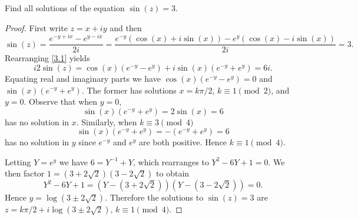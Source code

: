 \documentclass[12pt]{amsart}
\begin{document}
\begin{thm}
  Find all solutions of the equation $\sin(z) = 3$.
  \begin{proof}
    First write $z = x + iy$ and then
    \begin{equation}\label{3.1}
      \sin(z) = \frac{e^{-y + ix} - e^{y - ix}}{2i} = \frac{e^{-y}(\cos(x) + i\sin(x)) - e^y(\cos(x) - i\sin(x))}{2i} = 3.
    \end{equation}
    Rearranging \eqref{3.1} yields
    $$i2\sin(z) = \cos(x)(e^{-y} - e^{y}) + i\sin(x)(e^{-y} + e^y) = 6i.$$
    Equating real and imaginary parts we have $\cos(x)(e^{-y} - e^{y}) = 0$ and $\sin(x)(e^{-y} + e^y)$.
    The former has solutions $x = k\pi/2$, $k \equiv 1 \pmod{2}$, and $y = 0$.
    Observe that when $y = 0$, $$\sin(x)(e^{-y} + e^y) = 2\sin(x) = 6$$ has no solution in $x$.
	Similarly, when $k \equiv 3 \pmod{4}$
	$$\sin(x)(e^{-y} + e^y ) = -(e^{-y} + e^y) = 6$$ 
	has no solution in $y$ since $e^{-y}$ and $e^y$ are both positive.
    Hence $k \equiv 1 \pmod{4}$.
    
	Letting $Y = e^y$ we have $6 = Y^{-1} + Y$, which rearranges to $Y^2 - 6Y + 1 = 0$.
    We then factor $1 = (3 + 2\sqrt{2})(3 - 2\sqrt{2})$ to obtain $$Y^2 - 6Y + 1 = (Y - (3 + 2\sqrt{2}))(Y - (3 - 2\sqrt{2})) = 0.$$
    Hence $y = \log(3 \pm 2 \sqrt{2})$.
    Therefore the solutions to $\sin(z) = 3$ are $z = k\pi/2 + i \log(3 \pm 2\sqrt{2})$, $k \equiv 1 \pmod{4}$.
  \end{proof}
\end{thm}
\end{document}
